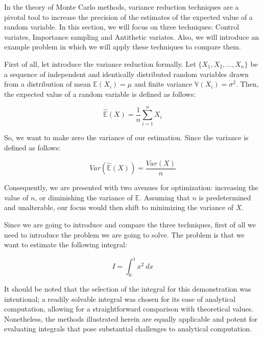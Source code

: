 \documentclass{article}
\begin{document}
In the theory of Monte Carlo methods, variance reduction techniques are a pivotal tool to increase the precision of the estimates of the expected value of a random variable. In this section, we will focus on three techniques: Control variates, Importance sampling and Antithetic variates. Also, we will introduce an example problem in which we will apply these techniques to compare them.

First of all, let introduce the variance reduction formally. Let \(\{X_1, X_2, ..., X_n\}\) be a sequence of independent and identically distributed random variables drawn from a distribution of mean \(\mathbb{E}(X_i) = \mu\) and finite variance \(\mathbb{V}(X_i) = \sigma^2\). Then, the expected value of a random variable is defined as follows:

\begin{equation} 
	\label{eq:expectedvalueestimate} 
	\hat{\mathbb{E}}(X) = \frac{1}{n} \sum_{i=1}^{n} X_i
\end{equation}

So, we want to make zero the variance of our estimation. Since the variance is defined as follows:

\begin{equation} 
	\label{eq:variance} 
	Var(\hat{\mathbb{E}}(X)) = \frac{Var(X)}{n}
\end{equation}

Consequently, we are presented with two avenues for optimization: increasing the value of \(n\), or diminishing the variance of \(\mathbb{E}\). Assuming that \(n\) is predetermined and unalterable, our focus would then shift to minimizing the variance of \(X\).

Since we are going to introduce and compare the three techniques, first of all we need to introduce the problem we are going to solve. The problem is that we want to estimate the following integral:

\begin{equation} \label{eq:integralvariancereduction} I = \int_{0}^{1} x^2 \ dx \end{equation}

It should be noted that the selection of the integral for this demonstration was intentional; a readily solvable integral was chosen for its ease of analytical computation, allowing for a straightforward comparison with theoretical values. Nonetheless, the methods illustrated herein are equally applicable and potent for evaluating integrals that pose substantial challenges to analytical computation.
\end{document}
